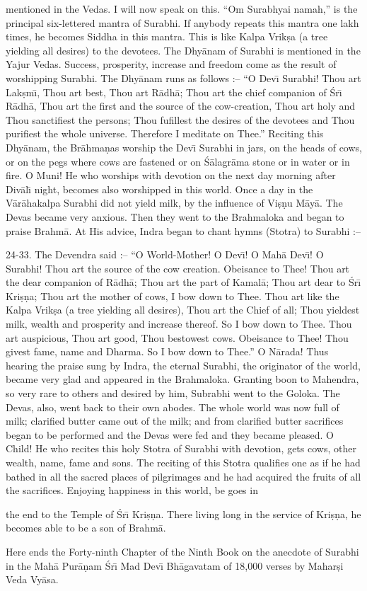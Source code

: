 mentioned in the Vedas. I will now speak on this. ``Om Surabhyai namah,'' is the principal six-lettered mantra of Surabhi. If anybody repeats this mantra one lakh times, he becomes Siddha in this mantra. This is like Kalpa Vrik\d{s}a (a tree yielding all desires) to the devotees. The Dhy\=anam of Surabhi is mentioned in the Yajur Vedas. Success, prosperity, increase and freedom come as the result of worshipping Surabhi. The Dhy\=anam runs as follows :-- ``O Dev\={\i} Surabhi! Thou art Lak\d{s}m\={\i}, Thou art best, Thou art R\=adh\=a; Thou art the chief companion of \'Sr\={\i} R\=adh\=a, Thou art the first and the source of the cow-creation, Thou art holy and Thou sanctifiest the persons; Thou fufillest the desires of the devotees and Thou purifiest the whole universe. Therefore I meditate on Thee.'' Reciting this Dhy\=anam, the Br\=ahma\d{n}as worship the Dev\={\i} Surabhi in jars, on the heads of cows, or on the pegs where cows are fastened or on \'S\=alagr\=ama stone or in water or in fire. O Muni! He who worships with devotion on the next day morning after Div\=al\={\i} night, becomes also worshipped in this world. Once a day in the V\=ar\=ahakalpa Surabhi did not yield milk, by the influence of Vi\d{s}\d{n}u M\=ay\=a. The Devas became very anxious. Then they went to the Brahmaloka and began to praise Brahm\=a. At His advice, Indra began to chant hymns (Stotra) to Surabhi :--

24-33. The Devendra said :-- ``O World-Mother! O Dev\={\i}! O Mah\=a Dev\={\i}! O Surabhi! Thou art the source of the cow creation. Obeisance to Thee! Thou art the dear companion of R\=adh\=a; Thou art the part of Kamal\=a; Thou art dear to \'Sr\={\i} Kri\d{s}\d{n}a; Thou art the mother of cows, I bow down to Thee. Thou art like the Kalpa Vrik\d{s}a (a tree yielding all desires), Thou art the Chief of all; Thou yieldest milk, wealth and prosperity and increase thereof. So I bow down to Thee. Thou art auspicious, Thou art good, Thou bestowest cows. Obeisance to Thee! Thou givest fame, name and Dharma. So I bow down to Thee.'' O N\=arada! Thus hearing the praise sung by Indra, the eternal Surabhi, the originator of the world, became very glad and appeared in the Brahmaloka. Granting boon to Mahendra, so very rare to others and desired by him, Subrabhi went to the Goloka. The Devas, also, went back to their own abodes. The whole world was now full of milk; clarified butter came out of the milk; and from clarified butter sacrifices began to be performed and the Devas were fed and they became pleased. O Child! He who recites this holy Stotra of Surabhi with devotion, gets cows, other wealth, name, fame and sons. The reciting of this Stotra qualifies one as if he had bathed in all the sacred places of pilgrimages and he had acquired the fruits of all the sacrifices. Enjoying happiness in this world, be goes in

the end to the Temple of \'Sr\={\i} Kri\d{s}\d{n}a. There living long in the service of Kri\d{s}\d{n}a, he becomes able to be a son of Brahm\=a.

Here ends the Forty-ninth Chapter of the Ninth Book on the anecdote of Surabhi in the Mah\=a Pur\=a\d{n}am \'Sr\={\i} Mad Dev\={\i} Bh\=agavatam of 18,000 verses by Mahar\d{s}i Veda Vy\=asa.



